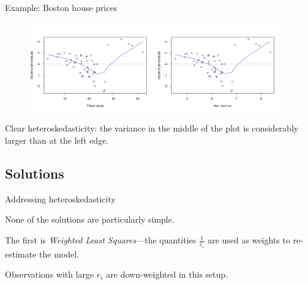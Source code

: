 \documentclass[12pt,english,pdf,xcolor=dvipsnames,aspectratio=169,handout]{beamer}\usepackage[]{graphicx}\usepackage[]{xcolor}
\begin{document}
\begin{frame}{Example: Boston house prices}



\begin{figure}
\includegraphics[width=0.48\textwidth]{../04-graphs/01-06.pdf}
\includegraphics[width=0.48\textwidth]{../04-graphs/01-07.pdf}
\end{figure}

Clear heteroskedasticity: the variance in the middle of the plot is considerably larger than at the left edge.

\end{frame}



\subsection{Solutions}

\begin{frame}{Addressing heteroskedasticity}

None of the solutions are particularly simple.\bigskip

The first is \textit{Weighted Least Squares}---the quantities $\frac{1}{e_i}$ are used as weights to re-estimate the model.\bigskip

Observations with large $e_i$ are down-weighted in this setup.

\end{frame}
\end{document}
